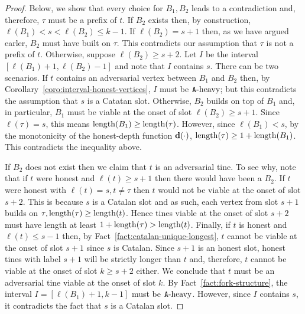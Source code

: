 \begin{proof}
    Below, we show that every choice for $B_1, B_2$ leads to a contradiction 
    and, therefore, $\tau$ must be a prefix of $t$. 
    If $B_2$ exists then, 
    by construction, $\ell(B_1) < s < \ell(B_2) \leq k - 1$.
    If $\ell(B_2) = s + 1$ then, as we have argued earler, 
    $B_2$ must have built on $\tau$. 
    This contradicts our assumption that 
    $\tau$ is not a prefix of $t$. 
    Otherwise, suppose $\ell(B_2) \geq s + 2$.  
    Let $I$ be the interval $[\ell(B_1) + 1, \ell(B_2) - 1]$ and note that  
    $I$ contains $s$. 
    There can be two scenarios.
    If $t$ contains an adversarial vertex between $B_1$ and $B_2$ then,  
    by Corollary~\ref{coro:interval-honest-vertices}, 
    $I$ must be $\mathtt{A}\text{-heavy}$; but 
    this contradicts the assumption that $s$ is a Catatan slot. 
    Otherwise,
    $B_2$ builds on top of $B_1$ and, 
    in particular, 
    $B_1$ must be viable at the onset of slot $\ell(B_2) \geq s + 1$. 
    Since $\ell(\tau) = s$, this means $\operatorname{length}(B_1) \geq \operatorname{length}(\tau)$. 
    However, since $\ell(B_1) < s$, 
    by the monotonicity of the honest-depth function $\mathbf{d}(\cdot)$, 
    $\operatorname{length}(\tau) \geq 1 + \operatorname{length}(B_1)$. 
    This contradicts the inequality above.           

    If $B_2$ does not exist then 
    we claim that $t$ is an adversarial tine. 
    To see why, note that if $t$ were honest and $\ell(t) \geq s + 1$ 
    then there would have been a $B_2$. 
    If $t$ were honest with $\ell(t) = s, t \neq \tau$ 
    then $t$ would not be viable at the onset of slot $s + 2$. 
    This is because $s$ is a Catalan slot and as such, 
    each vertex from slot $s + 1$ builds on $\tau, \operatorname{length}(\tau) \geq \operatorname{length}(t)$. 
    Hence tines viable at the onset of slot $s + 2$ must have length at least $1 + \operatorname{length}(\tau) > \operatorname{length}(t)$. 
    Finally, if $t$ is honest and $\ell(t) \leq s - 1$ then, 
    by Fact~\ref{fact:catalan-unique-longest}, 
    $t$ cannot be viable at the onset of slot $s + 1$ 
    since $s$ is Catalan.  
    Since $s + 1$ is an honest slot, 
    honest tines with label $s + 1$ will be strictly longer than $t$ 
    and, therefore, 
    $t$ cannot be viable at the onset of slot $k \geq s + 2$ either. 
    We conclude that $t$ must be an adversarial tine viable at the onset of slot $k$. 
    By Fact~\ref{fact:fork-structure},       
    the interval $I = [\ell(B_1) + 1, k - 1]$ must be $\mathtt{A}\text{-heavy}$. 
    However, since $I$ contains $s$, it contradicts the fact that $s$ is a Catalan slot.     
  \end{proof}


